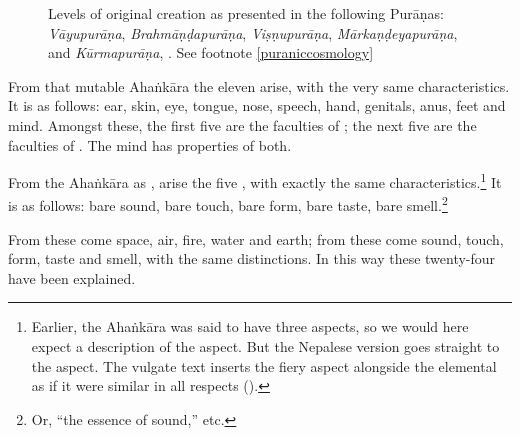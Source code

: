 \begin{translation}
\begin{figure}
              
                \caption{Levels of original creation as presented in the following 
                Purāṇas: \emph{Vāyupurāṇa}, \emph{Brahmāṇḍapurāṇa}, 
                \emph{Viṣṇupurāṇa}, \emph{Mārkaṇḍeyapurāṇa}, 
                and \emph{Kūrmapurāṇa}, \citep[after][27]{biar-1981}. 
                See footnote \ref{puraniccosmology}}
                \label{fig:biardeau1981-p27}
            \end{figure}
            
          
            
            
            From that mutable Ahaṅkāra the 
            eleven  arise, with the very same
            characteristics. It is as follows: ear, skin, eye, tongue, nose,
            speech, hand, genitals, anus, feet and mind.  Amongst these, the first 
            five are the faculties of ; the next five are the 
            faculties of .  The mind has properties of both.
            
            From the Ahaṅkāra as , arise the five ,
with exactly the same characteristics.\footnote{Earlier,
    the Ahaṅkāra was said to have three aspects, so we would
    here expect a description of the 
    aspect.  But the Nepalese version goes straight to the
     aspect.  The vulgate text inserts
    the fiery aspect alongside the elemental as if it were
    similar in all respects ().}  It is as
    follows: bare sound, bare touch, bare form, bare taste,
    bare smell.\footnote{Or, ``the essence of sound,'' etc.}
    
    From these  come space, air, fire, water and earth; 
    from these come sound, touch, form, taste and smell, with the same 
    distinctions.  In this way these twenty-four  have 
    been explained. 
            

\end{translation}
